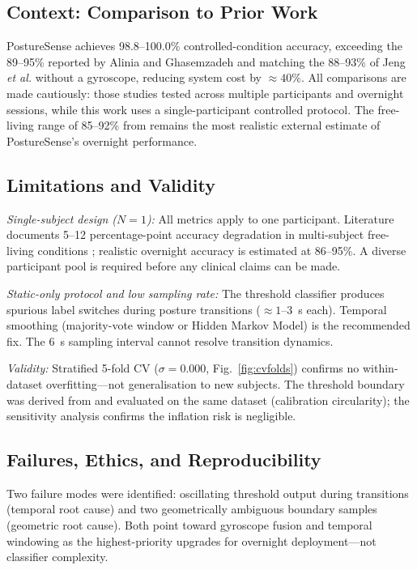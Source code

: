 \documentclass[journal]{IEEEtran}
\begin{document}
\subsection{Context: Comparison to Prior Work}
PostureSense achieves 98.8--100.0\% controlled-condition accuracy, exceeding
the 89--95\% reported by Alinia and Ghasemzadeh \cite{alinia2020} and
matching the 88--93\% of Jeng \textit{et al.} \cite{jeng2021} without a
gyroscope, reducing system cost by $\approx40\%$. All comparisons are made
cautiously: those studies tested across multiple participants and overnight
sessions, while this work uses a single-participant controlled protocol.
The free-living range of 85--92\% from \cite{alinia2020} remains the most
realistic external estimate of PostureSense's overnight performance.

\subsection{Limitations and Validity}
\textit{Single-subject design ($N=1$):} All metrics apply to one participant.
Literature documents 5--12 percentage-point accuracy degradation in
multi-subject free-living conditions \cite{alinia2020,razjouyan2017};
realistic overnight accuracy is estimated at 86--95\%. A diverse participant
pool is required before any clinical claims can be made.

\textit{Static-only protocol and low sampling rate:} The threshold classifier
produces spurious label switches during posture transitions ($\approx1$--3~s
each). Temporal smoothing (majority-vote window or Hidden Markov Model) is
the recommended fix. The 6~s sampling interval cannot resolve transition
dynamics.

\textit{Validity:} Stratified 5-fold CV ($\sigma=0.000$, Fig.~\ref{fig:cvfolds})
confirms no within-dataset overfitting---not generalisation to new subjects.
The threshold boundary was derived from and evaluated on the same dataset
(calibration circularity); the sensitivity analysis confirms the inflation
risk is negligible.

\subsection{Failures, Ethics, and Reproducibility}
Two failure modes were identified: oscillating threshold output during
transitions (temporal root cause) and two geometrically ambiguous boundary
samples (geometric root cause). Both point toward gyroscope fusion and
temporal windowing as the highest-priority upgrades for overnight
deployment---not classifier complexity.
\end{document}
